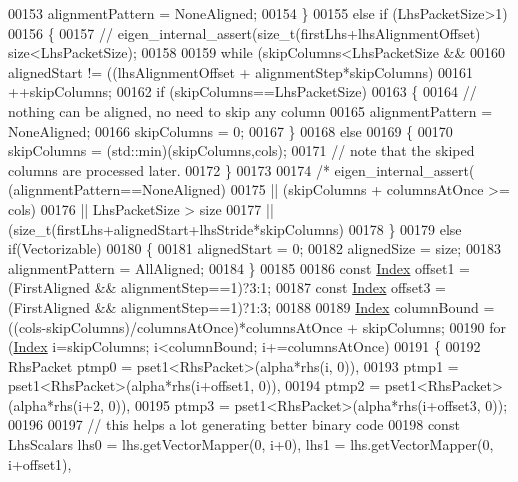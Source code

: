 \begin{DoxyCode}
00153     alignmentPattern = NoneAligned;
00154   \}
00155   \textcolor{keywordflow}{else} \textcolor{keywordflow}{if} (LhsPacketSize>1)
00156   \{
00157   \textcolor{comment}{//    eigen\_internal\_assert(size\_t(firstLhs+lhsAlignmentOffset)%
       size<LhsPacketSize);}
00158 
00159     \textcolor{keywordflow}{while} (skipColumns<LhsPacketSize &&
00160           alignedStart != ((lhsAlignmentOffset + alignmentStep*skipColumns)%
00161       ++skipColumns;
00162     \textcolor{keywordflow}{if} (skipColumns==LhsPacketSize)
00163     \{
00164       \textcolor{comment}{// nothing can be aligned, no need to skip any column}
00165       alignmentPattern = NoneAligned;
00166       skipColumns = 0;
00167     \}
00168     \textcolor{keywordflow}{else}
00169     \{
00170       skipColumns = (std::min)(skipColumns,cols);
00171       \textcolor{comment}{// note that the skiped columns are processed later.}
00172     \}
00173 
00174     \textcolor{comment}{/*    eigen\_internal\_assert(  (alignmentPattern==NoneAligned)}
00175 \textcolor{comment}{                      || (skipColumns + columnsAtOnce >= cols)}
00176 \textcolor{comment}{                      || LhsPacketSize > size}
00177 \textcolor{comment}{                      || (size\_t(firstLhs+alignedStart+lhsStride*skipColumns)%
00178   \}
00179   \textcolor{keywordflow}{else} \textcolor{keywordflow}{if}(Vectorizable)
00180   \{
00181     alignedStart = 0;
00182     alignedSize = size;
00183     alignmentPattern = AllAligned;
00184   \}
00185 
00186   \textcolor{keyword}{const} \hyperlink{namespace_eigen_a62e77e0933482dafde8fe197d9a2cfde}{Index} offset1 = (FirstAligned && alignmentStep==1)?3:1;
00187   \textcolor{keyword}{const} \hyperlink{namespace_eigen_a62e77e0933482dafde8fe197d9a2cfde}{Index} offset3 = (FirstAligned && alignmentStep==1)?1:3;
00188 
00189   \hyperlink{namespace_eigen_a62e77e0933482dafde8fe197d9a2cfde}{Index} columnBound = ((cols-skipColumns)/columnsAtOnce)*columnsAtOnce + skipColumns;
00190   \textcolor{keywordflow}{for} (\hyperlink{namespace_eigen_a62e77e0933482dafde8fe197d9a2cfde}{Index} i=skipColumns; i<columnBound; i+=columnsAtOnce)
00191   \{
00192     RhsPacket ptmp0 = pset1<RhsPacket>(alpha*rhs(i, 0)),
00193               ptmp1 = pset1<RhsPacket>(alpha*rhs(i+offset1, 0)),
00194               ptmp2 = pset1<RhsPacket>(alpha*rhs(i+2, 0)),
00195               ptmp3 = pset1<RhsPacket>(alpha*rhs(i+offset3, 0));
00196 
00197     \textcolor{comment}{// this helps a lot generating better binary code}
00198     \textcolor{keyword}{const} LhsScalars lhs0 = lhs.getVectorMapper(0, i+0),   lhs1 = lhs.getVectorMapper(0, i+offset1),
}
\end{DoxyCode}
